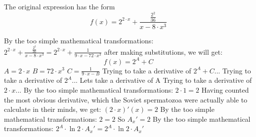 \documentclass[a4paper, 12pt]{article}
\begin{document}
                          
The original expression has the form \[f(x) = {{{2} ^ {{2} \cdot {x}}} +  \frac { \frac {{{2} ^ {2}}} {{36}}} {{{x} - {{8} \cdot {{x} ^ {3}}}}}} \]

By the too simple mathematical transformations:
 ${{{2} ^ {{2} \cdot {x}}} +  \frac { \frac {{{2} ^ {2}}} {{36}}} {{{x} - {{8} \cdot {{x} ^ {3}}}}}} = {{{2} ^ {{2} \cdot {x}}} +  \frac {{1}} {{{{9} \cdot {x}} - {{72} \cdot {{x} ^ {3}}}}}}$ 
 \newline
 \newline 
after making substitutions, we will get: \newline
 \[f(x) = {{{2} ^ {A}} + {C}}\]\newline
$A = {{2} \cdot {x}}$
\newline\newline
$B = {{72} \cdot {{x} ^ {3}}}$
\newline\newline
$C =  \frac {{1}} {{{{9} \cdot {x}} - {B}}}$
\newline\newline
\newline
Trying to take a derivative of ${{{2} ^ {A}} + {C}}$...\newline
\newline
Trying to take a derivative of ${{2} ^ {A}}$...\newline
\newline
Lets take a derivative of A\newline
Trying to take a derivative of ${{2} \cdot {x}}$...\newline
\newline
By the too simple mathematical transformations:
 ${{2} \cdot {1}} = {2}$ 
 \newline
 \newline 
Having counted the most obvious derivative, which the Soviet spermatozoa were actually able to calculate in their minds, we get:
$({{2} \cdot {x}})'(x) = {2}$\newline
\newline
By the too simple mathematical transformations:
 ${2} = {2}$ 
 \newline
 \newline 
So $A_x' = {2}$\newline
\newline
By the too simple mathematical transformations:
 ${{{{2} ^ {A}} \cdot  \ln {{2}} } \cdot {A_x'}} = {{{{2} ^ {A}} \cdot  \ln {{2}} } \cdot {A_x'}}$ 
 \newline
 \newline 
\end{document}
